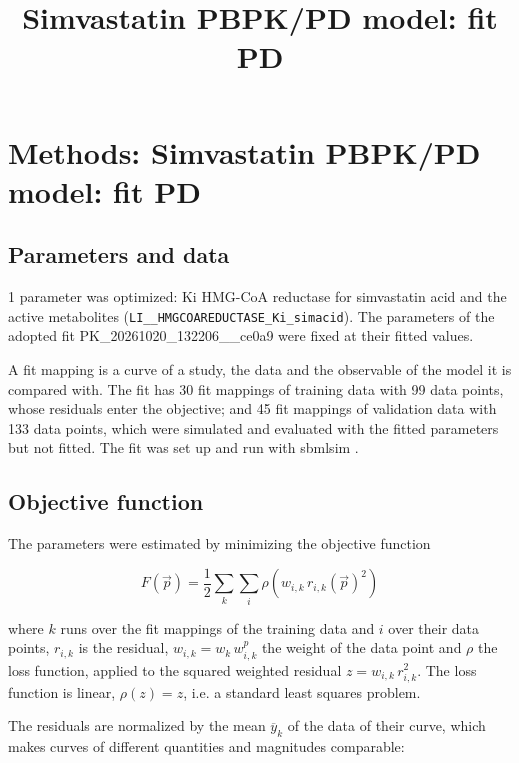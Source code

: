 \documentclass{article}
\title{Simvastatin PBPK/PD model: fit PD}
\date{}
\begin{document}
\maketitle

\section{Methods: Simvastatin PBPK/PD model: fit PD}

\subsection{Parameters and data}

1 parameter was optimized: Ki HMG-CoA reductase for simvastatin acid and the active metabolites (\texttt{LI\_\_HMGCOAREDUCTASE\_Ki\_simacid}). The parameters of the adopted fit PK\_20261020\_132206\_\_ce0a9 were fixed at their fitted values.

A fit mapping is a curve of a study, the data and the observable of the model it is compared with. The fit has 30 fit mappings of training data with 99 data points, whose residuals enter the objective; and 45 fit mappings of validation data with 133 data points, which were simulated and evaluated with the fitted parameters but not fitted. The fit was set up and run with sbmlsim \cite{Koenig2026_sbmlsim}.

\subsection{Objective function}

The parameters were estimated by minimizing the objective function

\begin{equation}
F(\vec{p}) = \frac{1}{2} \sum_{k} \sum_{i} \rho\left(w_{i,k}\, r_{i,k}(\vec{p})^2\right)
\end{equation}

where $k$ runs over the fit mappings of the training data and $i$ over their data points, $r_{i,k}$ is the residual, $w_{i,k} = w_k\, w^{p}_{i,k}$ the weight of the data point and $\rho$ the loss function, applied to the squared weighted residual $z = w_{i,k}\, r_{i,k}^2$. The loss function is linear, $\rho(z) = z$, i.e. a standard least squares problem.

The residuals are normalized by the mean $\overline{y}_k$ of the data of their curve, which makes curves of different quantities and magnitudes comparable:
\end{document}
